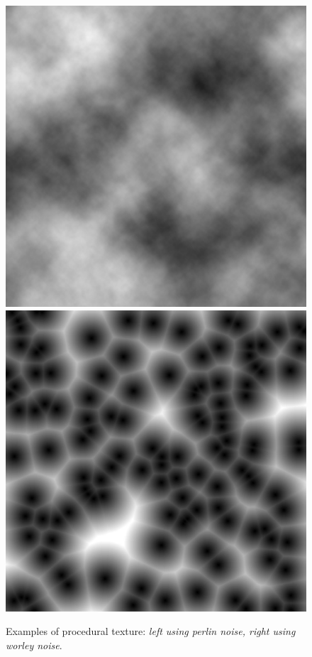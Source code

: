 \begin{figure}
    \begin{center}
    \includegraphics[scale=0.2]{images/PerlinNoise2d.png}
    \includegraphics[scale=0.1]{images/WorleyNoise2d.jpg}
    \end{center}
    \caption{Examples of procedural texture: \textit{left using perlin noise, right using worley noise}.}
    \label{procedural_texture}
\end{figure}

